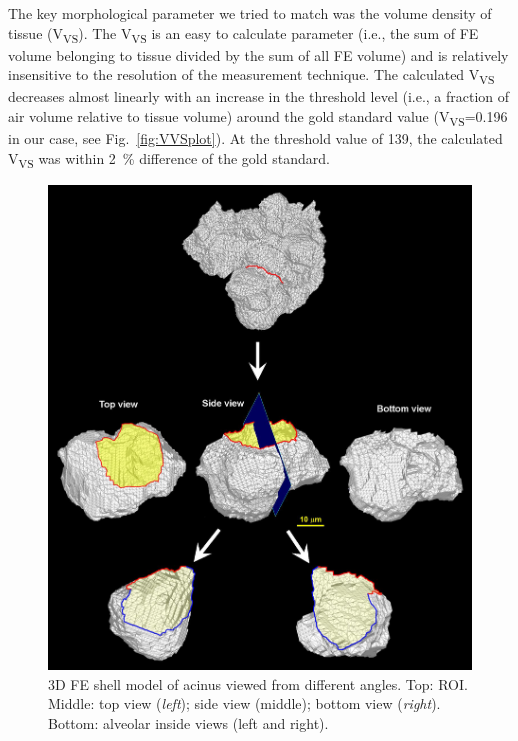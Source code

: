 The key morphological parameter we tried to match was the volume density of tissue (V\textsubscript{VS}). The V\textsubscript{VS} is an easy to calculate parameter (i.e., the sum of FE volume belonging to tissue divided by the sum of all FE volume) and is relatively insensitive to the resolution of the measurement technique. The calculated V\textsubscript{VS} decreases almost linearly with an increase in the threshold level (i.e., a fraction of air volume relative to tissue volume) around the gold standard value (V\textsubscript{VS}=0.196 in our case, see Fig.~\ref{fig:VVSplot}). At the threshold value of 139, the calculated V\textsubscript{VS} was within \SI{2}{\percent} difference of the gold standard.

\begin{figure}
	\centering
	\includegraphics[width=\imsize]{img/Tsuda2008/Tsuda-10}
	\caption{3D FE shell model of acinus viewed from different angles. Top: ROI. Middle: top view (\textit{left}); side view (middle); bottom view (\textit{right}). Bottom: alveolar inside views (left and right).}
	\label{fig:alveolus}
\end{figure}

